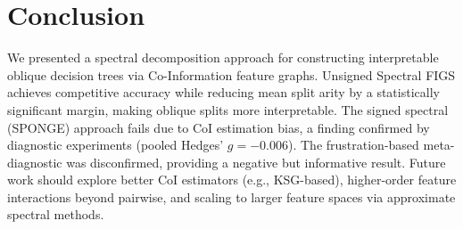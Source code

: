 \documentclass[11pt,letterpaper]{article}
\begin{document}
\section{Conclusion}

We presented a spectral decomposition approach for constructing interpretable oblique decision trees via Co-Information feature graphs.
Unsigned Spectral FIGS achieves competitive accuracy while reducing mean split arity by a statistically significant margin, making oblique splits more interpretable.
The signed spectral (SPONGE) approach fails due to CoI estimation bias, a finding confirmed by diagnostic experiments (pooled Hedges' $g=-0.006$).
The frustration-based meta-diagnostic was disconfirmed, providing a negative but informative result.
Future work should explore better CoI estimators (e.g., KSG-based), higher-order feature interactions beyond pairwise, and scaling to larger feature spaces via approximate spectral methods.



\end{document}

